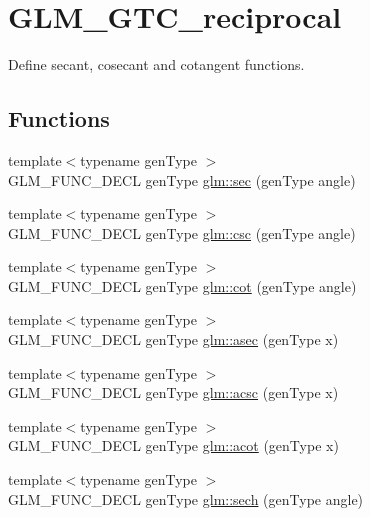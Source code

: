 \hypertarget{group__gtc__reciprocal}{}\section{G\+L\+M\+\_\+\+G\+T\+C\+\_\+reciprocal}
\label{group__gtc__reciprocal}


Define secant, cosecant and cotangent functions.  


\subsection*{Functions}
\begin{DoxyCompactItemize}
\item 
{\footnotesize template$<$typename gen\+Type $>$ }\\G\+L\+M\+\_\+\+F\+U\+N\+C\+\_\+\+D\+E\+CL gen\+Type \hyperlink{group__gtc__reciprocal_gae4bcbebee670c5ea155f0777b3acbd84}{glm\+::sec} (gen\+Type angle)
\item 
{\footnotesize template$<$typename gen\+Type $>$ }\\G\+L\+M\+\_\+\+F\+U\+N\+C\+\_\+\+D\+E\+CL gen\+Type \hyperlink{group__gtc__reciprocal_ga59dd0005b6474eea48af743b4f14ebbb}{glm\+::csc} (gen\+Type angle)
\item 
{\footnotesize template$<$typename gen\+Type $>$ }\\G\+L\+M\+\_\+\+F\+U\+N\+C\+\_\+\+D\+E\+CL gen\+Type \hyperlink{group__gtc__reciprocal_ga3a7b517a95bbd3ad74da3aea87a66314}{glm\+::cot} (gen\+Type angle)
\item 
{\footnotesize template$<$typename gen\+Type $>$ }\\G\+L\+M\+\_\+\+F\+U\+N\+C\+\_\+\+D\+E\+CL gen\+Type \hyperlink{group__gtc__reciprocal_ga2c5b7f962c2c9ff684e6d2de48db1f10}{glm\+::asec} (gen\+Type x)
\item 
{\footnotesize template$<$typename gen\+Type $>$ }\\G\+L\+M\+\_\+\+F\+U\+N\+C\+\_\+\+D\+E\+CL gen\+Type \hyperlink{group__gtc__reciprocal_ga1b4bed91476b9b915e76b4a30236d330}{glm\+::acsc} (gen\+Type x)
\item 
{\footnotesize template$<$typename gen\+Type $>$ }\\G\+L\+M\+\_\+\+F\+U\+N\+C\+\_\+\+D\+E\+CL gen\+Type \hyperlink{group__gtc__reciprocal_gaeadfb9c9d71093f7865b2ba2ca8d104d}{glm\+::acot} (gen\+Type x)
\item 
{\footnotesize template$<$typename gen\+Type $>$ }\\G\+L\+M\+\_\+\+F\+U\+N\+C\+\_\+\+D\+E\+CL gen\+Type \hyperlink{group__gtc__reciprocal_ga9a5cfd1e7170104a7b33863b1b75e5ae}{glm\+::sech} (gen\+Type angle)

\end{DoxyCompactItemize}
